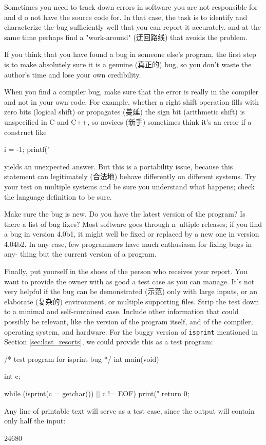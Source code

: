 Sometimes you need to track down errors in software you are not responsible
for and d o not have the source code for. In that case, the task is to
identify and characterize the bug sufficiently well that you can report it
accurately. and at the same time perhaps find a "work-around" (迂回路线)
that avoids the problem.

If you think that you have found a bug in someone else's program, the first
step is to make absolutely sure it is a genuine (真正的) bug, so you don't
waste the author's time and lose your own credibility.

When you find a compiler bug, make sure that the error is really in the
compiler and not in your own code. For example, whether a right shift
operation fills with zero bits (logical shift) or propagates (蔓延) the
sign bit (arithmetic shift) is unspecified in C and C++, so novices (新手)
sometimes think it's an error if a construct like
\begin{badcode}
    i = -1;
    printf("%
\end{badcode}
yields an unexpected answer. But this is a portability issue, because this
statement can legitimately (合法地) behave differently on different
systems. Try your test on multiple systems and be sure you understand what
happens; check the language definition to be sure.

Make sure the bug is new. Do you have the latest version of the program? Is
there a list of bug fixes? Most software goes through n~ultiple releases;
if you find a bug in version 4.0b1, it might well be fixed or replaced by a
new one in version 4.04b2. In any case, few programmers have much
enthusiasm for fixing bugs in any- thing but the current version of a
program.

Finally, put yourself in the shoes of the person who receives your report.
You want to provide the owner with as good a test case as you can manage.
It's not very helpful if the bug can be demonstrated (示范) only with large
inputs, or an elaborate (复杂的) environment, or multiple supporting files.
Strip the test down to a minimal and self-contained case. Include other
information that could possibly be relevant, like the version of the
program itself, and of the compiler, operating system, and hardware.  For
the buggy version of \verb'isprint' mentioned in Section
\ref{sec:last_resorts}, we could provide this as a test program:
\begin{wellcode}
    /* test program for isprint bug */
    int main(void)
    {
        int c;

        while (isprint(c = getchar()) || c != EOF)
            print("%
        return 0;
    }
\end{wellcode}
Any line of printable text will serve as a test case, since the output will
contain only half the input:
\begin{wellcode}
    24680
\end{wellcode}

